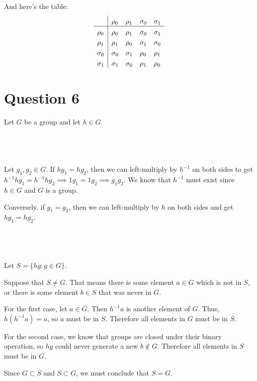 \documentclass[a4paper]{article}
\begin{document}
And here's the table:
\[
\setlength{\extrarowheight}{3pt}%
\begin{array}{l|*{4}{l}}
	& \rho_0 & \rho_1 & \sigma_0 & \sigma_1 \\
\hline
\rho_0 & \rho_0 & \rho_1 & \sigma_0 & \sigma_1 \\
\rho_1 & \rho_1 & \rho_0 & \sigma_1 & \sigma_0 \\
\sigma_0 & \sigma_0 & \sigma_1 & \rho_0 & \rho_1 \\
\sigma_1 & \sigma_1 & \sigma_0 & \rho_1 & \rho_0 \\
\end{array} 
\]

\section*{Question 6}
\setcounter{section}{6}
\setcounter{subsection}{0}

Let $G$ be a group and let $h \in G$.

\subsection{~}

Let $g_1, g_2 \in G$. If $h g_1 = h g_2$, then we can left-multiply by $h^{-1}$ on both sides to get $h^{-1} h g_1 = h^{-1} h g_2 \implies 1 g_1 = 1 g_2 \implies g_1 g_2$. We know that $h^{-1}$ must exist since $h \in G$ and $G$ is a group.

Conversely, if $g_1 = g_2$, then we can left-multiply by $h$ on both sides and get $h g_1 = h g_2$.

\subsection{~}

Let $S = \{hg : g \in G\}$.

Suppose that $S \ne G$. That means there is some element $a \in G$ which is not in $S$, or there is some element $b \in S$ that was never in $G$.

For the first case, let $a \in G$. Then $h^{-1} a$ is another element of $G$. Thus, $h \left( h^{-1} a \right) = a$, so $a$ must be in $S$. Therefore all elements in $G$ must be in $S$.

For the second case, we know that groups are closed under their binary operation, so $hg$ could never generate a new $b \notin G$. Therefore all elements in $S$ must be in $G$.

Since $G \subset S$ and $S \subset G$, we must conclude that $S = G$.
\end{document}

